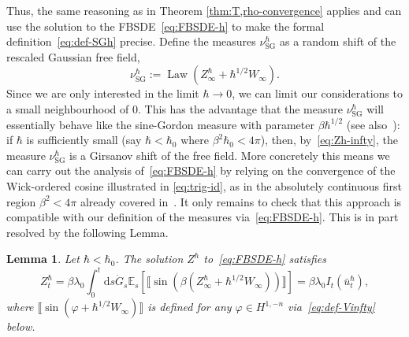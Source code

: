 \documentclass[11pt, a4paper]{scrartcl}
\numberwithin{equation}{section}
\theoremstyle{plain}
\newtheorem{lemma}[foo]{Lemma}
\theoremstyle{remark}
\newcommand{\assign}{:=}
\newcommand{\mathd}{\mathrm{d}}
\newcommand{\noplus}{}
\newcommand{\tmop}[1]{\ensuremath{\operatorname{#1}}}
\begin{document}
Thus, the same reasoning as in Theorem \ref{thm:T,rho-convergence} applies and
can use the solution to the FBSDE~\eqref{eq:FBSDE-h} to make the formal
definition~\eqref{eq:def-SGh} precise. Define the measures
$\nu_{\tmop{SG}}^{\hbar}$ as a random shift of the rescaled Gaussian free
field,
\[ \nu_{\tmop{SG}}^{\hbar} \assign \tmop{Law} (Z_{\infty}^{\hbar} \noplus
   \noplus + \hbar^{1 / 2} W_{\infty}) . \]
Since we are only interested in the limit $\hbar \rightarrow 0$, we can limit
our considerations to a small neighbourhood of $0$. This has the advantage
that the measure $\nu_{\tmop{SG}}^{\hbar}$ will essentially behave like the
sine-Gordon measure with parameter $\beta \hbar^{1 / 2}$ (see
also~{\cite[Section C]{colemanQuantumSineGordonEquation1975}}): if $\hbar$ is
sufficiently small (say $\hbar < \hbar_0$ where $\beta^2 \hbar_0 < 4 \pi$),
then, by~\eqref{eq:Zh-infty}, the measure $\nu_{\tmop{SG}}^{\hbar}$ is a
Girsanov shift of the free field. More concretely this means we can carry out
the analysis of~\eqref{eq:FBSDE-h} by relying on the convergence of the
Wick-ordered cosine illustrated in \eqref{eq:trig-id}, as in the absolutely
continuous first region $\beta^2 < 4 \pi$ already covered
in~{\cite{barashkovStochasticControlApproach2022}}. It only remains to check
that this approach is compatible with our definition of the measures
via~\eqref{eq:FBSDE-h}. This is in part resolved by the following Lemma.

\begin{lemma}
  \label{lem:Zhbar-wick}Let $\hbar < \hbar_0$. The solution $Z^{\hbar}$
  to~\eqref{eq:FBSDE-h} satisfies
  \begin{equation}
    Z^{\hbar}_t = \beta \lambda_0  \int_0^t \mathd s \dot{G}_s \mathbb{E}_s
    [\llbracket \sin (\beta (Z_{\infty}^{\hbar} + \hbar^{1 / 2} W_{\infty}))
    \rrbracket] \label{eq:Zhbar-wick} = \beta \lambda_0 I_t
    (\bar{u}^{\hbar}_t),
  \end{equation}
  where $\llbracket \sin (\varphi + \hbar^{1 / 2} W_{\infty}) \rrbracket$ is
  defined for any $\varphi \in H^{1, - n}$ via~\eqref{eq:def-Vinfty} below.
\end{lemma}
\end{document}
